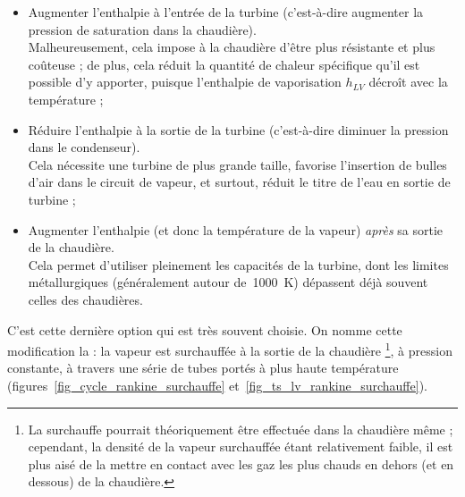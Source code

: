 		\begin{itemize}
			\item Augmenter l’enthalpie à l’entrée de la turbine (c’est-à-dire augmenter la pression de saturation dans la chaudière). \\
			Malheureusement, cela impose à la chaudière d’être plus résistante et plus coûteuse ; de plus, cela réduit la quantité de chaleur spécifique qu’il est possible d’y apporter, puisque l’enthalpie de vaporisation $h_{LV}$ décroît avec la température ;

			\item Réduire l’enthalpie à la sortie de la turbine (c’est-à-dire diminuer la pression dans le condenseur). \\
			Cela nécessite une turbine de plus grande taille,  favorise l’insertion de bulles d’air dans le circuit de vapeur, et surtout, réduit le titre de l’eau en sortie de turbine ;

			\item Augmenter l’enthalpie (et donc la température de la vapeur) \emph{après} sa sortie de la chaudière.\\
			Cela permet  d’utiliser pleinement les capacités de la turbine, dont les limites métallurgiques (généralement autour de~\SI{1000}{\kelvin}) dépassent déjà souvent celles des chaudières.
		\end{itemize}

		C’est cette dernière option qui est très souvent choisie. On nomme cette modification la  : la vapeur est surchauffée à la sortie de la chaudière%
		\footnote{La surchauffe pourrait théoriquement être effectuée dans la chaudière même ; cependant, la densité de la vapeur surchauffée étant relativement faible, il est plus aisé de la mettre en contact avec les gaz les plus chauds en dehors (et en dessous) de la chaudière.}, à pression constante, à travers une série de tubes portés à plus haute température (figures~\ref{fig_cycle_rankine_surchauffe} et~\ref{fig_ts_lv_rankine_surchauffe}).

